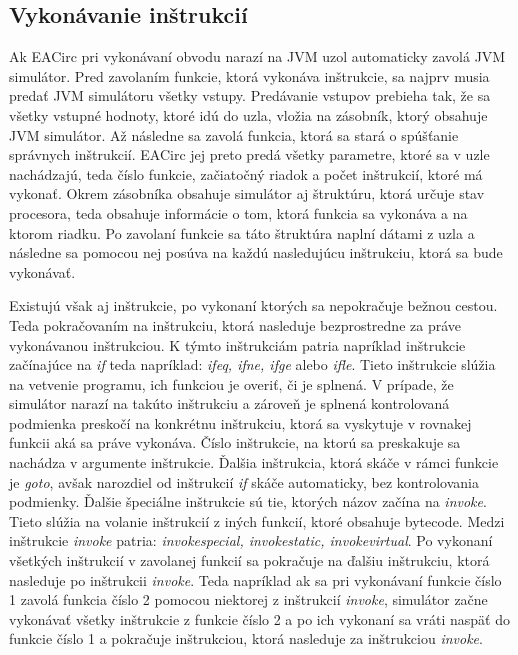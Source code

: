 \subsection{Vykonávanie inštrukcií} 
\label{subsec:emulating-ins}

Ak EACirc pri vykonávaní obvodu narazí na JVM uzol automaticky zavolá JVM simulátor. Pred zavolaním funkcie, ktorá vykonáva inštrukcie, sa najprv musia predať JVM simulátoru všetky vstupy. Predávanie vstupov prebieha tak, že sa všetky vstupné hodnoty, ktoré idú do uzla, vložia na zásobník, ktorý obsahuje JVM simulátor. Až následne sa zavolá funkcia, ktorá sa stará o spúšťanie správnych inštrukcií. EACirc jej preto predá všetky parametre, ktoré sa v uzle nachádzajú, teda číslo funkcie, začiatočný riadok a počet inštrukcií, ktoré má vykonať. Okrem zásobníka obsahuje simulátor aj štruktúru, ktorá určuje stav procesora, teda obsahuje informácie o tom, ktorá funkcia sa vykonáva a na ktorom riadku. Po zavolaní funkcie sa táto štruktúra naplní dátami z uzla a následne sa pomocou nej posúva na každú nasledujúcu inštrukciu, ktorá sa bude vykonávať.

Existujú však aj inštrukcie, po vykonaní ktorých sa nepokračuje bežnou cestou. Teda pokračovaním na inštrukciu, ktorá nasleduje bezprostredne za práve vykonávanou inštrukciou. K týmto inštrukciám patria napríklad inštrukcie začínajúce na \textit{if} teda napríklad: \textit{ifeq, ifne, ifge} alebo \textit{ifle}. Tieto inštrukcie slúžia na vetvenie programu, ich funkciou je overiť, či je splnená. V prípade, že simulátor narazí na takúto inštrukciu a zároveň je splnená kontrolovaná podmienka preskočí na konkrétnu inštrukciu, ktorá sa vyskytuje v rovnakej funkcii aká sa práve vykonáva. Číslo inštrukcie, na ktorú sa preskakuje sa nachádza v argumente inštrukcie. Ďalšia inštrukcia, ktorá skáče v rámci funkcie je \textit{goto}, avšak narozdiel od inštrukcií \textit{if} skáče automaticky, bez kontrolovania podmienky. Ďalšie špeciálne inštrukcie sú tie, ktorých názov začína na \textit{invoke}. Tieto slúžia na volanie inštrukcií z iných funkcií, ktoré obsahuje bytecode. Medzi inštrukcie \textit{invoke} patria: \textit{invokespecial, invokestatic, invokevirtual}. Po vykonaní všetkých inštrukcií v zavolanej funkcií sa pokračuje na ďalšiu inštrukciu, ktorá nasleduje po inštrukcii \textit{invoke}. Teda napríklad ak sa pri vykonávaní funkcie číslo 1 zavolá funkcia číslo 2 pomocou niektorej z inštrukcií \textit{invoke}, simulátor začne vykonávať všetky inštrukcie z funkcie číslo 2 a po ich vykonaní sa vráti naspäť do funkcie číslo 1 a pokračuje inštrukciou, ktorá nasleduje za inštrukciou \textit{invoke}.

